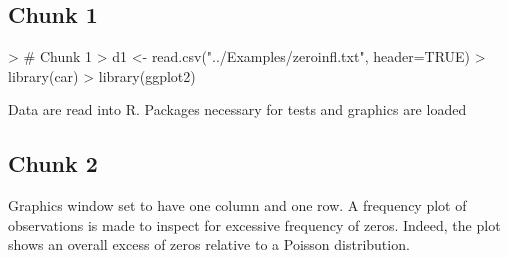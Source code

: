 \documentclass{article}
\begin{document}
\subsection{Chunk 1}
\begin{Schunk}
\begin{Sinput}
> # Chunk 1
> d1 <- read.csv("../Examples/zeroinfl.txt", header=TRUE)
> library(car)
> library(ggplot2)
\end{Sinput}
\end{Schunk}
Data are read into R. Packages necessary for tests and graphics are loaded

\subsection{Chunk 2}
\begin{Schunk}
\end{Schunk}

Graphics window set to have one column and one row. A frequency plot of observations is made to inspect for excessive frequency of zeros. Indeed, the plot shows an overall excess of zeros relative to a Poisson distribution.
\end{document}
